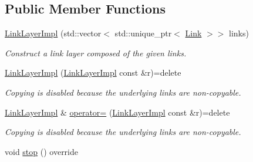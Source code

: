 \subsection*{Public Member Functions}
\begin{DoxyCompactItemize}
\item 
\hyperlink{classsma_1_1LinkLayerImpl_afb0d29b2c0897b87ee9508ce087a64e3}{Link\-Layer\-Impl} (std\-::vector$<$ std\-::unique\-\_\-ptr$<$ \hyperlink{classsma_1_1Link}{Link} $>$$>$ links)
\begin{DoxyCompactList}\small\item\em Construct a link layer composed of the given links. \end{DoxyCompactList}\item 
\hypertarget{classsma_1_1LinkLayerImpl_a106dd9f342d57a5b8de01f6f5be6259b}{\hyperlink{classsma_1_1LinkLayerImpl_a106dd9f342d57a5b8de01f6f5be6259b}{Link\-Layer\-Impl} (\hyperlink{classsma_1_1LinkLayerImpl}{Link\-Layer\-Impl} const \&r)=delete}\label{classsma_1_1LinkLayerImpl_a106dd9f342d57a5b8de01f6f5be6259b}

\begin{DoxyCompactList}\small\item\em Copying is disabled because the underlying links are non-\/copyable. \end{DoxyCompactList}\item 
\hypertarget{classsma_1_1LinkLayerImpl_af78279815467ea6f524d5668f661fe16}{\hyperlink{classsma_1_1LinkLayerImpl}{Link\-Layer\-Impl} \& \hyperlink{classsma_1_1LinkLayerImpl_af78279815467ea6f524d5668f661fe16}{operator=} (\hyperlink{classsma_1_1LinkLayerImpl}{Link\-Layer\-Impl} const \&r)=delete}\label{classsma_1_1LinkLayerImpl_af78279815467ea6f524d5668f661fe16}

\begin{DoxyCompactList}\small\item\em Copying is disabled because the underlying links are non-\/copyable. \end{DoxyCompactList}\item 
\hypertarget{classsma_1_1LinkLayerImpl_a22ee25f96b81111f5e780f617651e3bb}{void \hyperlink{classsma_1_1LinkLayerImpl_a22ee25f96b81111f5e780f617651e3bb}{stop} () override}\label{classsma_1_1LinkLayerImpl_a22ee25f96b81111f5e780f617651e3bb}


\end{DoxyCompactItemize}
